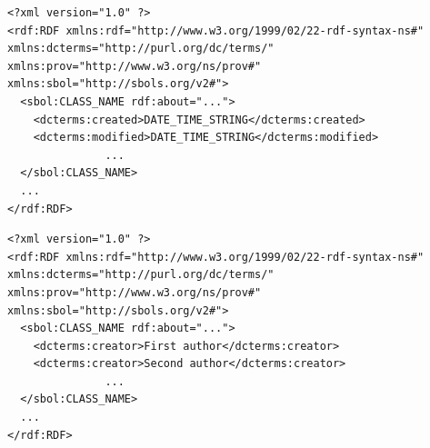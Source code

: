 \begin{lstlisting}
<?xml version="1.0" ?>
<rdf:RDF xmlns:rdf="http://www.w3.org/1999/02/22-rdf-syntax-ns#" xmlns:dcterms="http://purl.org/dc/terms/" xmlns:prov="http://www.w3.org/ns/prov#" xmlns:sbol="http://sbols.org/v2#">
  <sbol:CLASS_NAME rdf:about="...">
    <dcterms:created>DATE_TIME_STRING</dcterms:created>
    <dcterms:modified>DATE_TIME_STRING</dcterms:modified>
               ...
  </sbol:CLASS_NAME>
  ...
</rdf:RDF>
\end{lstlisting}

\begin{lstlisting}
<?xml version="1.0" ?>
<rdf:RDF xmlns:rdf="http://www.w3.org/1999/02/22-rdf-syntax-ns#" xmlns:dcterms="http://purl.org/dc/terms/" xmlns:prov="http://www.w3.org/ns/prov#" xmlns:sbol="http://sbols.org/v2#">
  <sbol:CLASS_NAME rdf:about="...">
    <dcterms:creator>First author</dcterms:creator>
    <dcterms:creator>Second author</dcterms:creator>
               ...
  </sbol:CLASS_NAME>
  ...
</rdf:RDF>
\end{lstlisting}


